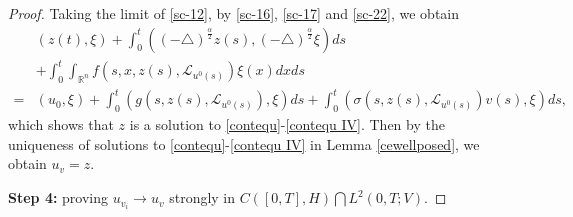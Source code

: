 \documentclass[10pt,a4paper]{amsart}
\begin{document}
\begin{proof}
    Taking the limit  of \eqref{sc-12}, by \eqref{sc-16}, \eqref{sc-17} and \eqref{sc-22},
    we  obtain
    \begin{align*}
        & \left( z (t), \xi \right)
        + \int_0^t
        \left( (-\triangle)^{\frac{\alpha}{2}} z(s),
        (-\triangle)^{\frac{\alpha}{2}} \xi
        \right) ds
        \nonumber \\
        & + \int_0^t \int_{\mathbb{R}^n} f( s, x, z(s), \mathcal{L}_{u^0(s)} ) \xi(x) dx ds
        \nonumber\\
        = & \left(u_0, \xi\right)
        + \int_0^t \left( g(s, z(s), \mathcal{L}_{u^0(s)} ), \xi \right) ds
        + \int_0^t \left( \sigma(s, z(s), \mathcal{L}_{u^0(s)} ) v(s), \xi \right) ds,
    \end{align*}
    which shows that  $z$ is a solution to \eqref{contequ}-\eqref{contequ IV}.
    Then by the uniqueness of solutions to \eqref{contequ}-\eqref{contequ IV} in Lemma \ref{cewellposed},
    we obtain $u_v = z$.

    {\bf Step 4:}   proving
    $ u_{v_i}  \rightarrow  u_v $ strongly in  $C([0,T], H) \bigcap L^2(0,T; V)$.


\end{proof}
\end{document}
